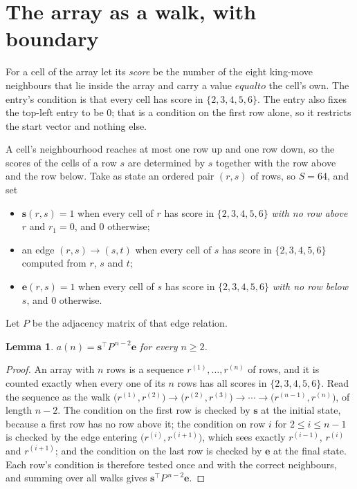 \documentclass[11pt,a4paper]{article}
\theoremstyle{plain}
\newtheorem{lemma}[theorem]{Lemma}
\theoremstyle{definition}
\begin{document}
\section{The array as a walk, with boundary}

For a cell of the array let its \emph{score} be the number of the eight king-move neighbours that lie inside
the array and carry a value $equal to$ the cell's own. The entry's condition is that every cell
has score in $\{2,3,4,5,6\}$. The entry also fixes the top-left entry to be $0$; that is a condition on the first row alone, so it restricts the start vector and nothing else.

A cell's neighbourhood reaches at most one row up and one row down, so the scores of the
cells of a row $s$ are determined by $s$ together with the row above and the row below.
Take as state an ordered pair $(r,s)$ of rows, so $S=64$, and set
\begin{itemize}
\item $\mathbf{s}(r,s)=1$ when every cell of $r$ has score in $\{2,3,4,5,6\}$ \emph{with no row
above $r$} and $r_1=0$, and $0$ otherwise;
\item an edge $(r,s)\to(s,t)$ when every cell of $s$ has score in $\{2,3,4,5,6\}$ computed from
$r$, $s$ and $t$;
\item $\mathbf{e}(r,s)=1$ when every cell of $s$ has score in $\{2,3,4,5,6\}$ \emph{with no row
below $s$}, and $0$ otherwise.
\end{itemize}
Let $P$ be the adjacency matrix of that edge relation.

\begin{lemma}\label{lem:walk}
$a(n)=\mathbf{s}^{\!\top}P^{\,n-2}\mathbf{e}$ for every $n\ge2$.
\end{lemma}

\begin{proof}
An array with $n$ rows is a sequence $r^{(1)},\dots,r^{(n)}$ of rows, and it is counted
exactly when every one of its $n$ rows has all scores in $\{2,3,4,5,6\}$. Read the sequence as the
walk $\bigl(r^{(1)},r^{(2)}\bigr)\to\bigl(r^{(2)},r^{(3)}\bigr)\to\cdots\to
\bigl(r^{(n-1)},r^{(n)}\bigr)$, of length $n-2$. The condition on the first row is
checked by $\mathbf{s}$ at the initial state, because a first row has no row above it; the
condition on row $i$ for $2\le i\le n-1$ is checked by the edge entering
$\bigl(r^{(i)},r^{(i+1)}\bigr)$, which sees exactly $r^{(i-1)}$, $r^{(i)}$ and
$r^{(i+1)}$; and the condition on the last row is checked by $\mathbf{e}$ at the final
state. Each row's condition is therefore tested once and with the correct neighbours, and
summing over all walks gives $\mathbf{s}^{\!\top}P^{\,n-2}\mathbf{e}$.
\end{proof}
\end{document}
